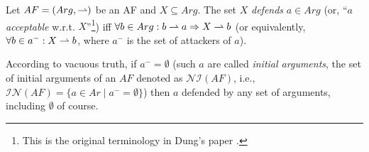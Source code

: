 












\begin{df}[Defense]
    Let $AF=(Arg,\rightharpoonup)$ be an AF and $X \subseteq Arg$. 
    The set $X$ \textit{defends} $a \in Arg$ 
    (or, ``$a$ \textit{acceptable} w.r.t. $X$''\footnote{
    This is the original terminology in Dung's paper \cite{Dun1995}.
    }) 
    iff 
    $\forall b \in Arg:b \rightharpoonup a \Rightarrow X \rightharpoonup b$
    (or equivalently, $\forall b \in a^- : X \rightharpoonup b$, 
    where $a^-$ is the set of attackers of $a$). 
\end{df}




According to vacuous truth,
if $a^- = \emptyset$
(such $a$ are called \textit{initial arguments}, 
the set of initial arguments of an $AF$ denoted as {\color{purple} $\mathcal{NI}(AF)$}, i.e., 
$\mathcal{IN}(AF) =  \{a \in Ar \mid a^- = \emptyset\}$)
then $a$ defended by any set of arguments, 
including $\emptyset$ of course.




